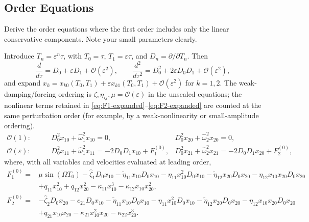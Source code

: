 \documentclass[11pt]{article}
\newenvironment{assignmentinstruction}{\par\begingroup\color{blue}}{\par\endgroup}
\begin{document}
\subsection{Order Equations}
\begin{assignmentinstruction}
Derive the order equations where the first order includes only the linear conservative components. Note your small parameters clearly.
\end{assignmentinstruction}
Introduce $T_n=\varepsilon^n\tau$, with $T_0=\tau$, $T_1=\varepsilon\tau$, and $D_n=\partial/\partial T_n$. Then
\[
\frac{d}{d\tau}=D_0+\varepsilon D_1+\mathcal{O}(\varepsilon^2),\qquad
\frac{d^2}{d\tau^2}=D_0^2+2\varepsilon D_0D_1+\mathcal{O}(\varepsilon^2),
\]
and expand $x_k=x_{k0}(T_0,T_1)+\varepsilon x_{k1}(T_0,T_1)+\mathcal{O}(\varepsilon^2)$ for $k=1,2$. The weak-damping/forcing ordering is $\zeta,\eta_{ij},\mu=\mathcal{O}(\varepsilon)$ in the unscaled equations; the nonlinear terms retained in \eqref{eq:F1-expanded}--\eqref{eq:F2-expanded} are counted at the same perturbation order (for example, by a weak-nonlinearity or small-amplitude ordering).
\begin{align}
\mathcal{O}(1):\qquad&D_0^2x_{10}+\hat\omega_1^2x_{10}=0,&
D_0^2x_{20}+\hat\omega_2^2x_{20}=0,\label{eq:order-zero}\\[2pt]
\mathcal{O}(\varepsilon):\qquad&D_0^2x_{11}+\hat\omega_1^2x_{11}=-2D_0D_1x_{10}+F_1^{(0)},&
D_0^2x_{21}+\hat\omega_2^2x_{21}=-2D_0D_1x_{20}+F_2^{(0)},\label{eq:order-one}
\end{align}
where, with all variables and velocities evaluated at leading order,
\begin{align*}
F_1^{(0)}={}&\mu\sin(\Omega T_0)-\hat\zeta_1D_0x_{10}-\widetilde\eta_{11}x_{10}D_0x_{10}-\eta_{11}x_{10}^2D_0x_{10}-\widetilde\eta_{12}x_{20}D_0x_{20}-\eta_{12}x_{10}x_{20}D_0x_{20}\\
&+q_{11}x_{10}^2+q_{12}x_{20}^2-\kappa_{11}x_{10}^3-\kappa_{12}x_{10}x_{20}^2,\\
F_2^{(0)}={}&-\hat\zeta_2D_0x_{20}-c_{21}D_0x_{10}-\widetilde\eta_{11}x_{10}D_0x_{10}-\eta_{11}x_{10}^2D_0x_{10}-\widetilde\eta_{12}x_{20}D_0x_{20}-\eta_{12}x_{10}x_{20}D_0x_{20}\\
&+q_{21}x_{10}x_{20}-\kappa_{21}x_{10}^2x_{20}-\kappa_{22}x_{20}^3.
\end{align*}
\end{document}
